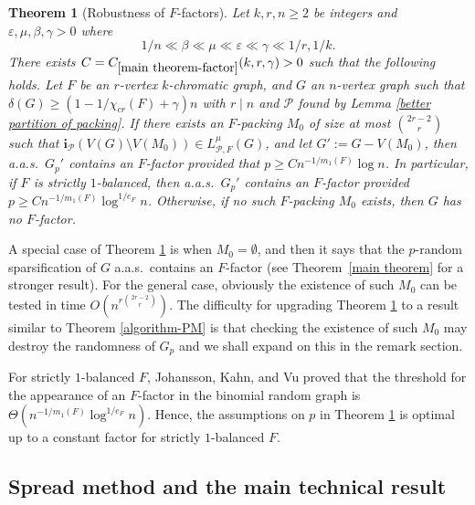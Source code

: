 \documentclass[11pt, letterpaper]{amsart}
\theoremstyle{plain}
\numberwithin{equation}{section}
\newtheorem{theorem}[thm]{Theorem}
\theoremstyle{definition}
\renewcommand{\vec}[1]{{\mathbf #1}}
\begin{document}
    \begin{theorem}
    [Robustness of $F$-factors]
    \label{main theorem-factor}
		Let $k,r,n\ge 2$ be integers and $\varepsilon,\mu,\beta,\gamma >0$ where 
        \[ 1/n\ll\beta\ll \mu\ll \varepsilon\ll\gamma\ll1/r,1/k. \]
        There exists $ C=C_{\ref{main theorem-factor}}(k,r,\gamma)>0 $ such that the following holds. 
        Let $F$ be an $r$-vertex \(k\)-chromatic graph, and $G$ an $n$-vertex graph such that $\delta(G)\ge (1-1/{\chi}_{cr}(F)+\gamma )n$ with $ r\mid n $ and $ \mathcal{P} $ found by Lemma \ref{better partition of packing}.
        If there exists an $F$-packing $ M_0 $ of size at most $\binom{2r-2}{r}$ such that $ \vec{i}_{\mathcal{P}}(V(G)\setminus V(M_0))\in L_{\mathcal{P},F}^{\mu}(G) $, and let $ G':=G-V(M_0) $, 
        then a.a.s.~$G_p'$ contains an $F$-factor provided that \(p\ge Cn^{-1/m_1(F)}\log n\).
        In particular, if \(F\) is strictly \(1\)-balanced, then a.a.s.~$G_p'$ contains an $F$-factor provided \(p\ge Cn^{-1/m_1(F)}{\log}^{1/e_F} n\).
        Otherwise, if no such $F$-packing $ M_0 $ exists, then $G$ has no \( F \)-factor.
    \end{theorem}

A special case of Theorem \ref{main theorem-factor} is when $M_0=\emptyset$, and then it says that the $p$-random sparsification of $G$ a.a.s.~contains an $F$-factor (see Theorem~\ref{main theorem} for a stronger result).
For the general case, obviously the existence of such $M_0$ can be tested in time $O(n^{r\binom{2r-2}{r}})$.
The difficulty for upgrading Theorem \ref{main theorem-factor} to a result similar to Theorem \ref{algorithm-PM} is that checking the existence of such $M_0$ may destroy the randomness of $G_p$ and we shall expand on this in the remark section.

For strictly \(1\)-balanced \(F\), Johansson, Kahn, and Vu \cite{johansson2008factors} proved that the threshold for the appearance of an \(F\)-factor in the binomial random graph is \( \Theta\left(n^{-1/m_1(F)}{\log}^{1/e_F} n\right)\). 
Hence, the assumptions on $p$ in Theorem \ref{main theorem-factor} is optimal up to a constant factor for strictly \(1\)-balanced $F$.

    

    \subsection{Spread method and the main technical result}
    
\end{document}
